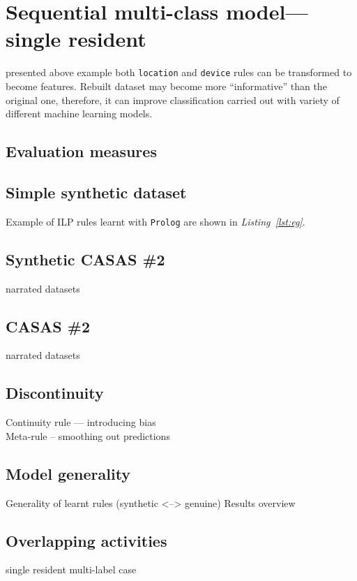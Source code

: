 \documentclass[12pt, a4paper, pdflatex, leqno, twoside, openright]{report}
\begin{document}
\chapter{Sequential multi-class model---single resident\label{ch:smcm}}
presented above example both \texttt{location} and \texttt{device} rules can be transformed to become features. Rebuilt dataset may become more ``informative'' than the original one, therefore, it can improve classification carried out with variety of different machine learning models.

  \section{Evaluation measures}
  \section{Simple synthetic dataset}

Example of ILP rules learnt with \texttt{Prolog} are shown in \emph{Listing~\ref{lst:eg}}.

  \section{Synthetic CASAS \#2}
narrated datasets
  \section{CASAS \#2}
narrated datasets
  \section{Discontinuity}
Continuity rule --- introducing bias\\
Meta-rule -- smoothing out predictions
  \section{Model generality}
Generality of learnt rules (synthetic <--> genuine) Results overview
  \section{Overlapping activities}
single resident multi-label case
\end{document}
